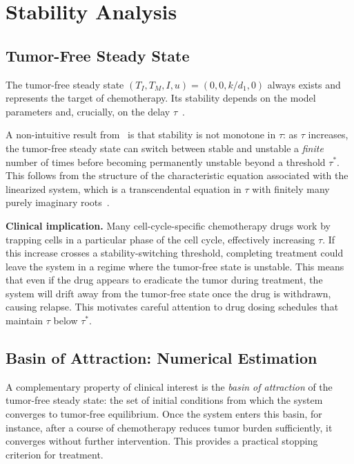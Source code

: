 \section{Stability Analysis}
\label{sec:analysis}

\subsection{Tumor-Free Steady State}

The tumor-free steady state $(T_I, T_M, I, u) = (0, 0, k/d_1, 0)$ always exists and represents the target of chemotherapy. Its stability depends on the model parameters and, crucially, on the delay $\tau$~\cite{villasana_delay_2003}.

A non-intuitive result from~\cite{villasana_delay_2003} is that stability is not monotone in $\tau$: as $\tau$ increases, the tumor-free steady state can switch between stable and unstable a \emph{finite} number of times before becoming permanently unstable beyond a threshold $\tau^*$. This follows from the structure of the characteristic equation associated with the linearized system, which is a transcendental equation in $\tau$ with finitely many purely imaginary roots~\cite{cooke_zeroes_1986}.

\textbf{Clinical implication.} Many cell-cycle-specific chemotherapy drugs work by trapping cells in a particular phase of the cell cycle, effectively increasing $\tau$. If this increase crosses a stability-switching threshold, completing treatment could leave the system in a regime where the tumor-free state is unstable. This means that even if the drug appears to eradicate the tumor during treatment, the system will drift away from the tumor-free state once the drug is withdrawn, causing relapse. This motivates careful attention to drug dosing schedules that maintain $\tau$ below $\tau^*$.

\subsection{Basin of Attraction: Numerical Estimation}

A complementary property of clinical interest is the \emph{basin of attraction} of the tumor-free steady state: the set of initial conditions from which the system converges to tumor-free equilibrium. Once the system enters this basin, for instance, after a course of chemotherapy reduces tumor burden sufficiently, it converges without further intervention. This provides a practical stopping criterion for treatment.

